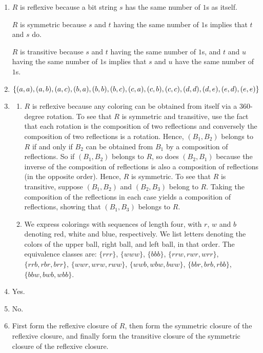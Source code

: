 \documentclass{sig-alternate-05-2015}
\begin{document}
\begin{enumerate}
\item $R$ is reflexive because a bit string $s$ has the same 
number of $1$s as itself. 

$R$ is symmetric because
$s$ and $t$ having the same number of $1$s implies that $t$ and $s$ do.

$R$ is transitive because $s$ and $t$ having the same number of $1$s,
and $t$ and $u$ having the same number of $1$s implies that $s$ and
$u$ have the same number of $1$s.

\item $\{(a, a), (a, b),
	(a, c), (b, a), (b, b), (b, c), (c, a),\\ (c, b), (c, c), (d, d), (d, e),
	(e, d), (e, e)\}$

\item 
\begin{enumerate}
	\item $R$ is
	reflexive because any coloring can be obtained from itself via
	a 360-degree rotation. To see that $R$ is symmetric and transitive,
	use the fact that each rotation is the composition of two reflections and conversely the composition of two reflections
	is a rotation. Hence, $(B_1, B_2)$ belongs to $R$ if and only
	if $B_2$ can be obtained from $B_1$ by a composition of reflections.
	So if $(B_1, B_2)$ belongs to $R$, so does $(B_2, B_1)$ because
	the inverse of the composition of reflections is also a composition
	of reflections (in the opposite order). Hence, $R$ is
	symmetric. To see that $R$ is transitive, suppose $(B_1, B_2)$ and
	$(B_2, B_3)$ belong to $R$. Taking the composition of the reflections
	in each case yields a composition of reflections, showing
	that $(B_1,B_3)$ belongs to $R$. 
	\item We express colorings with sequences
	of length four, with $r$, $w$ and $b$ denoting red, white and blue,
	respectively. We list letters denoting the colors of the upper
	ball, right ball, and left ball, in that order. The equivalence classes are: $\{rrr\}$, $\{www\}$, $\{bbb\}$, $\{rrw, rwr, wrr\}$, $\{rrb, rbr, brr\}$, $\{wwr, wrw, rww\}$, $\{wwb, wbw, bww\}$, $\{bbr, brb, rbb\}$, $\{bbw, bwb, wbb\}$.
\end{enumerate}

\item Yes.

\item No.

\item First form the reflexive closure of $R$, then form
the symmetric closure of the reflexive closure, and finally
form the transitive closure of the symmetric closure of the
reflexive closure.
\end{enumerate}
\end{document}
